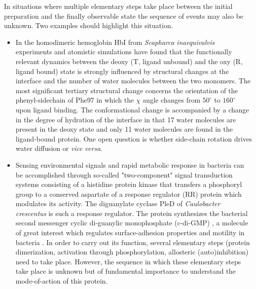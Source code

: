 \documentclass[journal=jacsat,manuscript=article]{achemso}
\begin{document}
In situations where multiple elementary steps take place between the
initial preparation and the finally observable state the sequence of
events may also be unknown. Two examples should highlight this
situation.
\begin{itemize}
\item In the homodimeric hemoglobin HbI from {\it Scapharca
  inaequivalvis}
  experiments\cite{Song1993,Royer1990,Knapp2005,Nienhaus2007,Chiancone2000,Eaton1999,choi2010}
  and atomistic simulations\cite{Zhou2003,Knapp2009,MM.scapharca:2016}
  have found that the functionally relevant dynamics between the deoxy
  (T, ligand unbound) and the oxy (R, ligand bound) state is strongly
  influenced by structural changes at the interface and the number of
  water molecules between the two monomers. The most significant
  tertiary structural change concerns the orientation of the
  phenyl-sidechain of Phe97 in which the $\chi$ angle changes from
  $50^\circ$ to $160^\circ$ upon ligand binding. The conformational
  change is accompanied by a change in the degree of hydration of the
  interface in that 17 water molecules are present in the deoxy state
  and only 11 water molecules are found in the ligand-bound
  protein. One open question is whether side-chain rotation drives
  water diffusion or {\it vice versa}.

\item Sensing environmental signals and rapid metabolic response in
  bacteria can be accomplished through so-called "two-component"
  signal transduction systems\cite{Stock2000_b} consisting of a
  histidine protein kinase that transfers a phosphoryl group to a
  conserved aspartate of a response regulator (RR) protein which
  modulates its activity. The diguanylate cyclase PleD of {\it
    Caulobacter crescentus} is such a response
  regulator.\cite{Aldridge1999,Aldridge2003,Paul2004,Hecht1997} The
  protein synthesizes the bacterial second messenger cyclic
  di-guanylic monophosphate (c-di-GMP) \cite{Paul2004}, a molecule of
  great interest which regulates surface-adhesion properties and
  motility in bacteria \cite{Malone2006}. In order to carry out its
  function, several elementary steps (protein dimerization, activation
  through phosphorylation, allosteric (auto)inhibition) need to take
  place.\cite{Jenal2006} However, the sequence in which these
  elementary steps take place is unknown but of fundamental importance
  to understand the mode-of-action of this protein.
\end{itemize}
\end{document}
